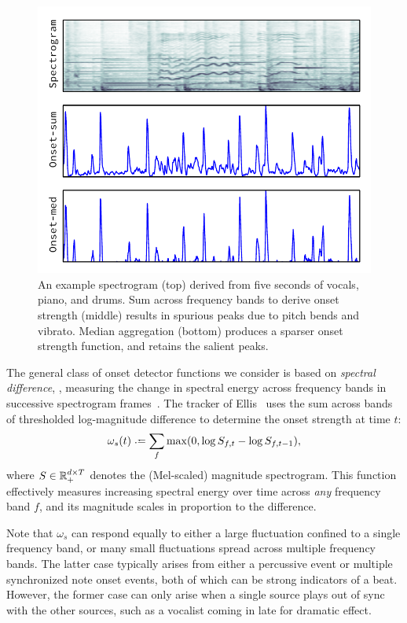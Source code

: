 \documentclass{article}
\begin{document}
\begin{figure}
\centering%
\includegraphics[width=\columnwidth]{figs/onsets}%
\vspace{-\baselineskip}%
\caption{An example spectrogram (top) derived from five seconds of vocals, piano, and drums.  
Sum across frequency bands to derive onset strength (middle) results in spurious peaks due to pitch bends and vibrato.
Median aggregation (bottom) produces a sparser onset strength function, and retains the salient peaks.}
\label{fig:onsets}
\end{figure}

The general class of onset detector functions we consider is based on \emph{spectral 
difference}, \ie, measuring the change in spectral energy across frequency bands in 
successive spectrogram frames~\cite{bello2005tutorial}. The tracker 
of Ellis~\cite{ellis2007beat} uses the sum across bands of thresholded log-magnitude
difference to determine the onset strength at time $t$:
\begin{equation}
\omega_s(t) \defeq \sum_f \max(0, \log S_{f, t} - \log S_{f, t-1}),\label{eq:onset:sum}
\end{equation}
where $S \in \mathbb{R}_+^{d\times T}$ denotes the (Mel-scaled) magnitude spectrogram.  
This function effectively measures increasing spectral energy over time across 
\emph{any} frequency band $f$, and its magnitude scales in proportion to the 
difference.

Note that $\omega_s$ can respond equally to either a large fluctuation confined to a 
single frequency band, or many small fluctuations spread across multiple frequency bands.
The latter case typically arises from either a percussive event or multiple synchronized 
note onset events, both of which can be strong indicators of a beat.  However, the former 
case can only arise when a single source plays out of sync with the other sources, such 
as a vocalist coming in late for dramatic effect.
\end{document}
